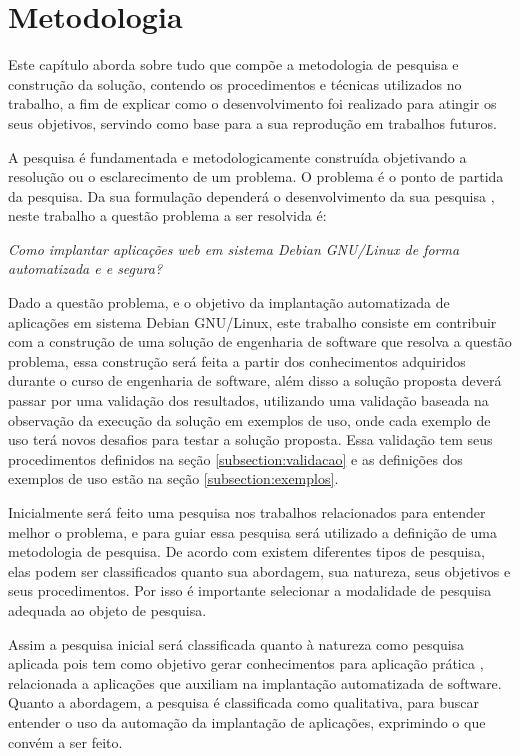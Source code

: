 \chapter{Metodologia}
\label{cap-metodologia}
Este capítulo aborda sobre tudo que compõe a metodologia de pesquisa e construção
da solução, contendo os procedimentos e técnicas utilizados no trabalho, a fim de
explicar como o desenvolvimento foi realizado para atingir os seus objetivos,
servindo como base para a sua reprodução em trabalhos futuros.

A pesquisa é fundamentada e metodologicamente construída objetivando a resolução
ou o esclarecimento de um problema. O problema é o ponto de partida da pesquisa.
Da sua formulação dependerá o desenvolvimento da sua pesquisa \cite{moresi2003metodologia}, neste trabalho a questão problema a ser resolvida é:

\begin{center}
  \textit{
  Como implantar aplicações web em sistema Debian GNU/Linux de forma automatizada e
  e segura?
}
\end{center}

Dado a questão problema, e o objetivo da implantação automatizada
de aplicações em sistema Debian GNU/Linux, este trabalho consiste em contribuir
com a construção de uma solução de engenharia de software que resolva a questão
problema, essa construção será feita a partir dos conhecimentos adquiridos durante
o curso de engenharia de software, além disso a solução proposta deverá passar
por uma validação dos resultados, utilizando uma validação baseada na observação
da execução da solução em exemplos de uso, onde cada exemplo de uso terá novos
desafios para testar a solução proposta. Essa validação tem seus procedimentos
definidos na seção \ref{subsection:validacao} e as definições dos exemplos de uso
estão na seção \ref{subsection:exemplos}.

Inicialmente será feito uma pesquisa nos trabalhos relacionados para entender
melhor o problema, e para guiar essa pesquisa será utilizado a definição de uma
metodologia de pesquisa. De acordo com \cite{gerhardt2009metodos} existem diferentes
tipos de pesquisa, elas podem ser classificados quanto sua abordagem, sua natureza,
seus objetivos e seus procedimentos. Por isso é importante selecionar a modalidade
de pesquisa adequada ao objeto de pesquisa.

Assim a pesquisa inicial será classificada quanto à natureza como pesquisa aplicada
pois tem como objetivo gerar conhecimentos para aplicação prática \cite{gerhardt2009metodos},
relacionada a aplicações que auxiliam na implantação automatizada de software.
Quanto a abordagem, a pesquisa é classificada como qualitativa, para buscar entender
o uso da automação da implantação de aplicações, exprimindo o que convém
a ser feito.

